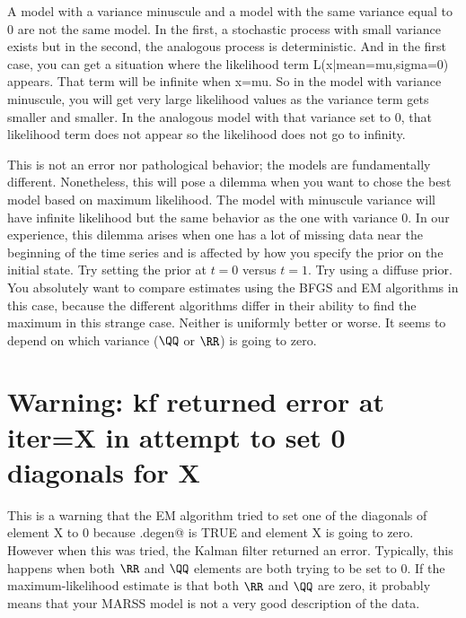 A model with a variance minuscule and a model with the same variance equal to 0 are not the same model.  In the first, a stochastic process with small variance exists but in the second, the analogous process is deterministic.  And in the first case, you can get a situation where the likelihood term L(x|mean=mu,sigma=0) appears.  That term will be infinite when x=mu. So in the model with variance minuscule, you will get very large likelihood values as the variance term gets smaller and smaller.  In the analogous model with that variance set to 0, that likelihood term does not appear so the likelihood does not go to infinity.  

This is not an error nor pathological behavior; the models are fundamentally different.  Nonetheless, this will pose a dilemma when you want to chose the best model based on maximum likelihood.  The model with minuscule variance will have infinite likelihood but the same behavior as the one with variance 0.   In our experience, this dilemma arises when one has a lot of missing data near the beginning of the time series and is affected by how you specify the prior on the initial state.  Try setting the prior at $t=0$ versus $t=1$.  Try using a diffuse prior.  You absolutely want to compare estimates using the BFGS and EM algorithms in this case, because the different algorithms differ in their ability to find the maximum in this strange case.  Neither is uniformly better or worse.  It seems to depend on which variance ($\QQ$ or $\RR$) is going to zero.

\section*{Warning: kf returned error at iter=X in attempt to set 0 diagonals for X}
This is a warning that the EM algorithm tried to set one of the diagonals of element X to 0 because \verb@allow.degen@ is TRUE and element X is going to zero.  However when this was tried, the Kalman filter returned an error.  Typically, this happens when both $\RR$ and $\QQ$ elements are both trying to be set to 0.  If the maximum-likelihood estimate is that both $\RR$ and $\QQ$ are zero, it probably means that your MARSS model is not a very good description of the data.

